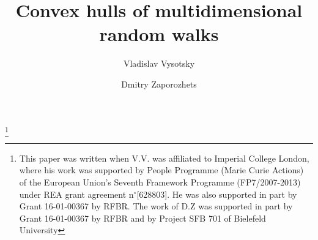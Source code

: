 \documentclass[12pt, reqno]{amsart}
\begin{document}
\title{Convex hulls of multidimensional random walks}

\author{Vladislav Vysotsky}
\address{University of Sussex and St.\ Petersburg Department of Steklov Mathematical Institute}

\author{Dmitry Zaporozhets}
\address{St.\ Petersburg Department of Steklov Mathematical Institute}



\thanks{This paper was written when V.V. was affiliated to Imperial College London, where his work was supported by People Programme (Marie Curie Actions) of the European Union's Seventh Framework Programme (FP7/2007-2013) under REA grant agreement n$^\circ$[628803].
He was also supported in part by Grant 16-01-00367 by RFBR. The work of D.Z was supported in part by Grant 16-01-00367 by RFBR and by Project SFB 701 of Bielefeld University}
\end{document}
